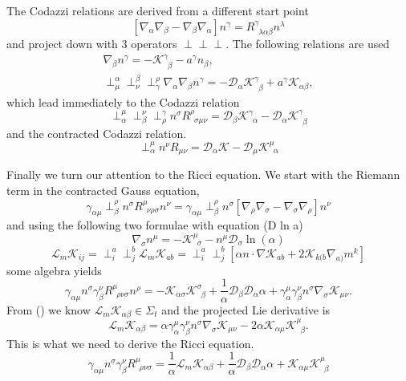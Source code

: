 \documentclass[11pt, oneside]{report}  %
\newcommand{\K}{\mathcal{K}}
\renewcommand{\L}{\mathcal{L}}
\numberwithin{equation}{section}
\begin{document}
The Codazzi relations are derived from a different start point
$$  [\nabla_\alpha\nabla_\beta-\nabla_\beta\nabla_\alpha]n^\gamma = {R}^\gamma_{\,\,\,\lambda \alpha\beta}n^\lambda $$
and project down with 3 operators $\perp\perp\perp$. The following relations are used 
\begin{gather*} \nabla_\beta n^\gamma = -\mathcal{K}^\gamma_{\,\,\,\beta} - a^\gamma n_\beta,\\
 \perp^\alpha_\mu \perp^\beta_\nu \perp^\rho_\gamma \nabla_\alpha \nabla_\beta n^\gamma = -\mathcal{D}_\alpha \mathcal{K}^\gamma_{\,\,\,\beta} + a^\gamma \mathcal{K}_{\alpha\beta},\end{gather*}
which lead immediately to the Codazzi relation
\begin{equation}\perp_\alpha^\mu \perp_\beta^\nu \perp^\gamma_\rho n^\sigma R^\rho_{\,\,\,\sigma\mu\nu} =  \mathcal{D}_\beta \mathcal{K}^\gamma_{\,\,\,\alpha} -\mathcal{D}_\alpha \mathcal{K}^\gamma_{\,\,\,\beta}\end{equation}
and the contracted Codazzi relation.
\begin{equation}\perp^\mu_\alpha  n^\nu R_{\mu\nu} =  \mathcal{D}_\alpha \mathcal{K} -\mathcal{D}_\mu \mathcal{K}^\mu_{\,\,\,\alpha}\end{equation}


Finally we turn our attention to the Ricci equation. We start with the Riemann term in the contracted Gauss equation,
\begin{equation}\gamma_{\alpha\mu}\perp^\rho_\beta n^\sigma R^\mu_{\,\,\,\nu\rho\sigma}n^\nu =
\gamma_{\alpha\mu}\perp^\rho_\beta n^\sigma\left[ \nabla_\rho\nabla_\sigma-\nabla_\sigma\nabla_\rho\right]n^\nu\end{equation}
and using the following two formulae with equation (D ln a)
\begin{equation} \nabla_\sigma n^\mu = -\mathcal{K}^\mu_{\,\,\,\sigma}-n^\mu \mathcal{D}_\sigma \ln(\alpha)\end{equation}
\begin{equation} \L_m \K_{ij}  = \perp^a_i\perp^b_j\L_m \K_{ab} =\perp^a_i\perp^b_j\left[ \alpha n\cdot \nabla \K_{ab} + 2 \K_{k(b}\nabla_{a)}m^k\right] \end{equation}
some algebra yields
$$  \gamma_{\alpha\mu}n^\sigma \gamma^\nu_\beta R^\mu_{\,\,\,\rho\nu\sigma} n^\rho = -\mathcal{K}_{\alpha\sigma}\mathcal{K}^\sigma_{\,\,\,\beta} +\frac{1}{\alpha}\mathcal{D}_\beta\mathcal{D}_\alpha \alpha + \gamma^\mu_\alpha\gamma^\nu_\beta n^\sigma \nabla_\sigma \mathcal{K}_{\mu\nu}.$$
From () we know $\mathcal{L}_m\mathcal{K}_{\alpha\beta} \in \Sigma_t$ and the projected Lie derivative is
$$  \mathcal{L}_m\mathcal{K}_{\alpha\beta} = \alpha \gamma^\mu_\alpha \gamma^\nu_\beta n^\sigma \nabla_\sigma \mathcal{K}_{\mu\nu} - 2\alpha\mathcal{K}_{\alpha\mu}\mathcal{K}^\mu_{\,\,\,\beta}.$$
This is what we need to derive the Ricci equation.
\begin{equation}\gamma_{\alpha\mu}n^\sigma \gamma^\nu_\beta R^\mu_{\,\,\,\rho\nu\sigma} = \frac{1}{\alpha}\mathcal{L}_m \mathcal{K}_{\alpha\beta} +\frac{1}{\alpha}\mathcal{D}_\beta\mathcal{D}_\alpha \alpha +\mathcal{K}_{\alpha\mu}\mathcal{K}^\mu_{\,\,\,\beta}  \end{equation}
\end{document}
